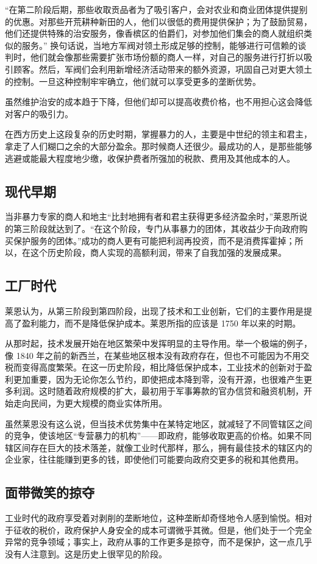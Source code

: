 “在第二阶段后期，那些收取贡品者为了吸引客户，会对农业和商业团体提供提别的优惠。对那些开荒耕种新田的人，他们以很低的费用提供保护；为了鼓励贸易，他们还提供特殊的治安服务，像香槟区的伯爵们，对参加他们集会的商人就组织类似的服务。” 换句话说，当地方军阀对领土形成足够的控制，能够进行可信赖的谈判时，他们就会像那些需要扩张市场份额的商人一样，对自己的服务进行打折以吸引顾客。然后，军阀们会利用新增经济活动带来的额外资源，巩固自己对更大领土的控制。一旦这种控制牢牢确立，他们就可以享受更多的垄断优势。

虽然维护治安的成本趋于下降，但他们却可以提高收费价格，也不用担心这会降低对客户的吸引力。

在西方历史上这段复杂的历史时期，掌握暴力的人，主要是中世纪的领主和君主，拿走了人们糊口之余的大部分盈余。那时候商人还很少。最成功的人，是那些能够逃避或能最大程度地少缴，收保护费者所强加的税款、费用及其他成本的人。

\subsection{现代早期}
当非暴力专家的商人和地主“比封地拥有者和君主获得更多经济盈余时，”莱恩所说的第三阶段就达到了。“在这个阶段，专门从事暴力的团体，其收益少于向政府购买保护服务的团体。”成功的商人更有可能把利润再投资，而不是消费挥霍掉；所以，在这个历史阶段，商人实现的高额利润，带来了自我加强的发展成果。

\subsection{工厂时代}
莱恩认为，从第三阶段到第四阶段，出现了技术和工业创新，它们的主要作用是提高了盈利能力，而不是降低保护成本。莱恩所指的应该是 1750 年以来的时期。

从那时起，技术发展开始在地区繁荣中发挥明显的主导作用。举一个极端的例子，像 1840 年之前的新西兰，在某些地区根本没有政府存在，但也不可能因为不用交税而变得高度繁荣。在这一历史阶段，相比降低保护成本，工业技术的创新对于盈利更加重要，因为无论你怎么节约，即使把成本降到零，没有开源，也很难产生更多利润。这时随着政府规模的扩大，最初用于军事筹款的官办信贷和融资机制，开始走向民间，为更大规模的商业实体所用。

虽然莱恩没有这么说，但当技术优势集中在某特定地区，就减轻了不同管辖区之间的竞争，使该地区“专营暴力的机构”——即政府，能够收取更高的价格。如果不同辖区间存在巨大的技术落差，就像工业时代那样，那么，拥有最佳技术的辖区内的企业家，往往能赚到更多的钱，即使他们可能要向政府交更多的税和其他费用。

\subsection{面带微笑的掠夺}
工业时代的政府享受着对剥削的垄断地位，这种垄断却奇怪地令人感到愉悦。相对于征收的税价，政府保护人身安全的成本可谓微乎其微。但是，他们处于一个完全异常的竞争领域；事实上，政府从事的工作更多是掠夺，而不是保护，这一点几乎没有人注意到。这是历史上很罕见的阶段。


